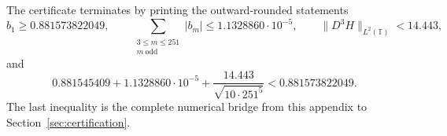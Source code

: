 The certificate terminates by printing the outward-rounded statements
\[
  b_1\ge0.881573822049,
  \qquad
  \sum_{\substack{3\le m\le251\\m\ \mathrm{odd}}}|b_m|
  \le1.1328860\cdot10^{-5},
  \qquad
  \|D^3H\|_{L^2(\mathbb T)}<14.443,
\]
and
\[
  0.881545409+1.1328860\cdot10^{-5}
  +\frac{14.443}{\sqrt{10\cdot251^5}}
  <0.881573822049.
\]
The last inequality is the complete numerical bridge from this appendix to
Section~\ref{sec:certification}.












